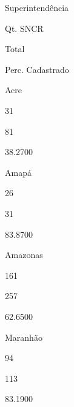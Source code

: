 \documentclass[
  letterpaper,
]{report}
\begin{document}
\n  

\n    

\n      

Superintendência

\n      

Qt. SNCR

\n      

Total

\n      

Perc. Cadastrado

\n    

\n  

\n  

\n    

\n      

Acre

\n      

31

\n      

81

\n      

38.2700

\n    

\n    

\n      

Amapá

\n      

26

\n      

31

\n      

83.8700

\n    

\n    

\n      

Amazonas

\n      

161

\n      

257

\n      

62.6500

\n    

\n    

\n      

Maranhão

\n      

94

\n      

113

\n      

83.1900

\n    

\n    
\end{document}

